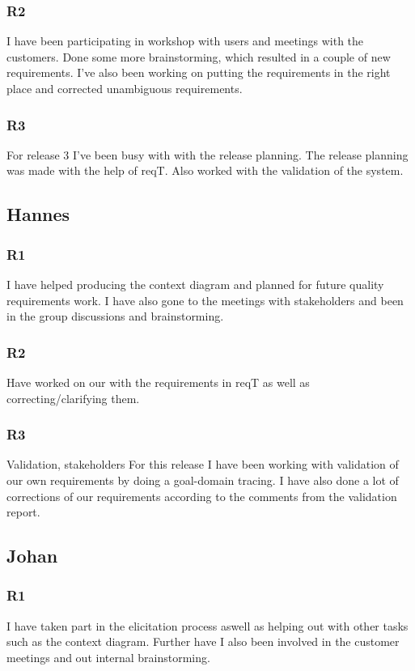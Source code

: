\documentclass[a4paper]{article}
\begin{document}
		\subsubsection{R2}
		I have been participating in workshop with users and meetings with the customers. Done some more brainstorming, which resulted in a couple of new requirements. I've also been working on putting the requirements in the right place and corrected unambiguous requirements.
		\subsubsection{R3}
		For release 3 I've been busy with with the release planning. The release planning was made with the help of reqT. Also worked with the validation of the system.
		
	\subsection{Hannes}
		\subsubsection{R1}
		I have helped producing the context diagram and planned for future quality requirements work. I have also gone to the meetings with stakeholders and been in the group discussions and brainstorming.
		\subsubsection{R2}
		Have worked on our with the requirements in reqT as well as correcting/clarifying them.  
		\subsubsection{R3}
		Validation, stakeholders
		For this release I have been working with validation of our own requirements by doing a goal-domain tracing. I have also done a lot of corrections of our requirements according to the comments from the validation report. 
	
	
	\subsection{Johan}
		\subsubsection{R1}
		I have taken part in the elicitation process aswell as helping out with other tasks such as the context diagram. Further have I also been involved in the customer meetings and out internal brainstorming.
\end{document}
